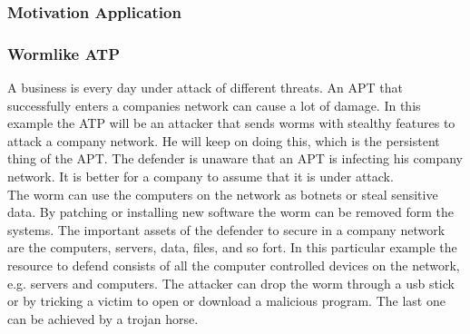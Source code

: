 \subsubsection{Motivation Application}
\subsubsection*{Wormlike ATP}
A business is every day under attack of different threats. An APT that successfully enters a companies network can cause a lot of damage. In this example the ATP will be an attacker that sends worms with stealthy features to attack a company network. He will keep on doing this, which is the persistent thing of the APT. The defender is unaware that an APT is infecting his company network. It is better for a company to assume that it is under attack. \\
The worm can use the computers on the network as botnets or steal sensitive data. By patching or installing new software the worm can be removed form the systems. The important assets of the defender to secure in a company network are the computers, servers, data, files, and so fort. In this particular example the resource to defend consists of all the computer controlled devices on the network, e.g. servers and computers. The attacker can drop the worm through a usb stick or by tricking a victim to open or download a malicious program. The last one can be achieved by a trojan horse. 
